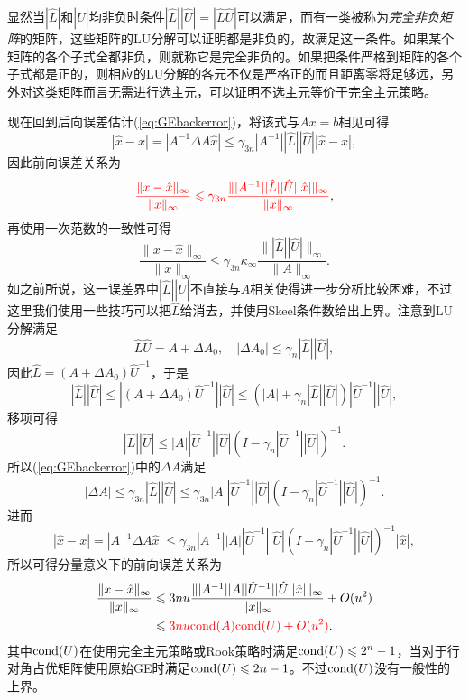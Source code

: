\documentclass[a4paper,10pt]{ctexart}
\begin{document}
显然当$ |\hat{L}|$和$|\hat{U}| $均非负时条件$ |\hat{L}| |\hat{U}|=|\hat{L} \hat{U}| $可以满足，而有一类被称为\emph{完全非负矩阵}的矩阵，这些矩阵的LU分解可以证明都是非负的，故满足这一条件。如果某个矩阵的各个子式全都非负，则就称它是完全非负的。如果把条件严格到矩阵的各个子式都是正的，则相应的LU分解的各元不仅是严格正的而且距离零将足够远，另外对这类矩阵而言无需进行选主元，可以证明不选主元等价于完全主元策略。

现在回到后向误差估计(\ref{eq:GEbackerror})，将该式与$ Ax=b $相见可得
\[
    |\hat{x} - x| = |A^{-1} \Delta A \hat{x}|\leqslant \gamma_{3n} | A^{-1} | |\hat{L}| |\hat{U}| | \hat{x} - x |,
\]
因此前向误差关系为
\begin{equation}
    \textcolor{red}{\frac{\| x - \hat{x} \|_\infty}{\| x \|_\infty} \leqslant \gamma_{3n}  \frac{\| | A^{-1} | | \hat{L} | |\hat{U}| |\hat{x}| \|_\infty}{\| x \|_\infty}},
\end{equation}
再使用一次范数的一致性可得
\begin{equation}
    \frac{\| x - \hat{x} \|_\infty}{\| x \|_\infty} \leqslant \gamma_{3n}\kappa_\infty  \frac{\| | \hat{L} | |\hat{U}| \|_\infty}{\| A \|_\infty}.
\end{equation}
如之前所说，这一误差界中$ |\hat{L}| |\hat{U}| $不直接与$ A $相关使得进一步分析比较困难，不过这里我们使用一些技巧可以把$ \hat{L} $给消去，并使用Skeel条件数给出上界。注意到LU分解满足
\[
    \hat{L} \hat{U} = A + \Delta A_0,\quad |\Delta A_0|\leqslant \gamma_n |\hat{L}| |\hat{U}|,
\]
因此$ \hat{L} = (A+\Delta A_0)\hat{U}^{-1} $，于是
\[
    |\hat{L}| |\hat{U}| \leqslant |(A+\Delta A_0)\hat{U}^{-1}| |\hat{U}|\leqslant (|A|+\gamma_n|\hat{L}| |\hat{U}|)|\hat{U}^{-1}| |\hat{U}|,
\]
移项可得
\[
    |\hat{L}| |\hat{U}|\leqslant |A| |\hat{U}^{-1}| |\hat{U}| (I - \gamma_n |\hat{U}^{-1}| |\hat{U}|)^{-1}.
\]
所以(\ref{eq:GEbackerror})中的$ \Delta A $满足
\begin{equation}
    |\Delta A| \leqslant  \gamma_{3n}|\hat{L}| |\hat{U}|\leqslant \gamma_{3n}|A| |\hat{U}^{-1}| |\hat{U}| (I - \gamma_n |\hat{U}^{-1}| |\hat{U}|)^{-1}.
\end{equation}
进而
\[
    |\hat{x} - x| = |A^{-1} \Delta A \hat{x}|\leqslant \gamma_{3n} | A^{-1} | |A| |\hat{U}^{-1}| |\hat{U}| (I - \gamma_n |\hat{U}^{-1}| |\hat{U}|)^{-1}|\hat{x}|,
\]
所以可得分量意义下的前向误差关系为
\begin{equation}
    \begin{aligned}
        \frac{\| x - \hat{x} \|_\infty}{\| x \|_\infty} &\leqslant 3nu \frac{\| | A^{-1} | | A | |\hat{U}^{-1}| |\hat{U}| |\hat{x}| \|_\infty}{\| x \|_\infty} + O(u^2)\\
        &\leqslant \textcolor{red}{3n u {\rm cond}(A) {\rm cond}(U)+O(u^2)}.
    \end{aligned}
\end{equation}
其中$ {\rm cond}(U) $在使用完全主元策略或Rook策略时满足$ {\rm cond}(U)\leqslant 2^n-1 $，当对于行对角占优矩阵使用原始GE时满足$ {\rm cond}(U)\leqslant 2n-1 $。不过$ {\rm cond}(U) $没有一般性的上界。
\end{document}
